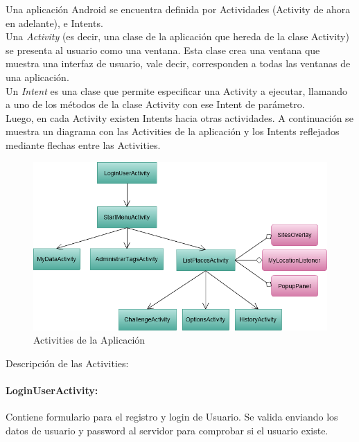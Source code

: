 \documentclass[10pt,letterpaper]{article}
\begin{document}
Una aplicación Android se encuentra definida por Actividades (Activity de ahora en adelante), e Intents.\\

Una \textit{Activity} (es decir, una clase de la aplicación que hereda de la clase Activity) se presenta al usuario como una ventana. Esta clase crea una ventana que muestra una interfaz de usuario, vale decir, corresponden a todas las ventanas de una aplicación. \\

Un \textit{Intent} es una clase que permite especificar una Activity a ejecutar, llamando a uno de los métodos de la clase Activity con ese Intent de parámetro.\\

Luego, en cada Activity existen Intents hacia otras actividades. A continuación se muestra un diagrama con las Activities de la aplicación y los Intents reflejados mediante flechas entre las Activities.\\

\begin{figure}[h]
\hspace{-1cm}
\includegraphics[width=400pt]{./imgs/TripdroidActivities.png}
\caption{Activities de la Aplicación}
\end{figure}

\newpage
Descripción de las Activities:\\

\paragraph{LoginUserActivity:} Contiene formulario para el registro y login de Usuario. Se valida enviando los datos de usuario y password al servidor para comprobar si el usuario existe.
\end{document}
